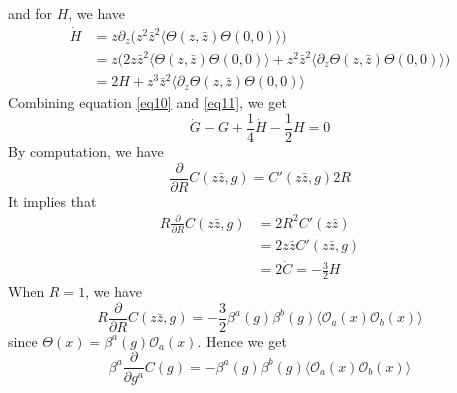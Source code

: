 and for $H$, we have
\begin{equation}
\label{eq11}
	\begin{split}
	\dot{H} & = z \partial_z \big( z^2 \bar{z}^2 \langle \Theta(z,\bar{z}) \Theta(0,0) \rangle \big)\\
	& =z \big(2 z \bar{z}^2 \langle \Theta (z,\bar{z}) \Theta(0,0) \rangle + z^2 \bar{z}^2 \langle \partial_z \Theta(z,\bar{z}) \Theta(0,0) \rangle \big)\\
	& = 2H + z^3 \bar{z}^2 \langle \partial_z \Theta(z,\bar{z}) \Theta(0,0)\rangle 
	\end{split}
\end{equation}
Combining equation \ref{eq10} and \ref{eq11}, we get 
\[
\dot{G} - G + \frac{1}{4} \dot{H} - \frac{1}{2} H =0
\]
By computation, we have
\begin{equation}
	\frac{\partial}{\partial R} C(z\bar{z},g) = C'(z \bar{z},g) 2R
\end{equation}
It implies that 
\begin{equation}
	\begin{split}
	R \frac{\partial}{\partial R} C(z\bar{z},g) &= 2R^2 C'(z\bar{z})\\
	 &= 2z \bar{z}C'(z\bar{z},g) \\
	 &= 2 \dot{C} = -\frac{3}{2}H
	\end{split}
\end{equation}
When $R=1$, we have 
\[
R \frac{\partial}{\partial R} C(z\bar{z},g)= - \frac{3}{2} \beta^a(g)\beta^b(g) \langle \mathcal{O}_a(x) \mathcal{O}_b(x) \rangle 
\]
since $\Theta(x)= \beta^a(g) \mathcal{O}_a(x)$. Hence we get
\begin{equation}
	\beta^a \frac{\partial}{\partial g^a} C(g)= -\beta^a(g)\beta^b(g) \langle \mathcal{O}_a(x) \mathcal{O}_b(x) \rangle 
\end{equation}

